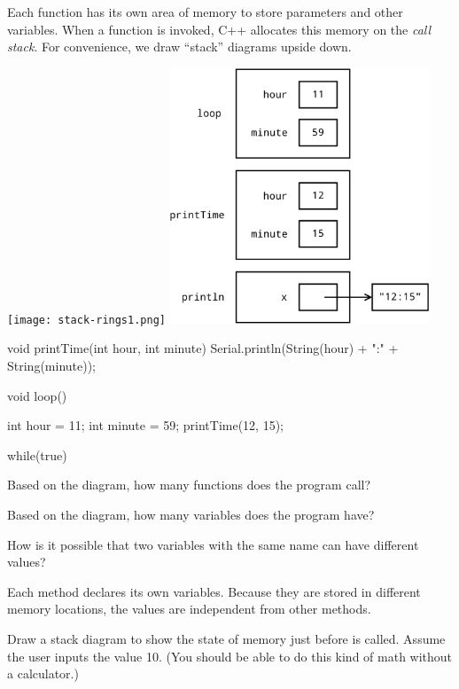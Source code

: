 
Each function has its own area of memory to store parameters and other variables.
When a function is invoked, C++ allocates this memory on the \emph{call stack}.
For convenience, we draw ``stack'' diagrams upside down.

\begin{center}
\texttt{[image: stack-rings1.png]}
\hspace{1em}
\includegraphics[height=3in]{stack1_loop-crop.pdf}
\end{center}


\begin{javalst}
void printTime(int hour, int minute) {
    Serial.println(String(hour) + ":" + String(minute));
}

void loop() {
    int hour = 11;
    int minute = 59;
    printTime(12, 15);

    while(true) {
    }
}
\end{javalst}



\Q Based on the diagram, how many functions does the program call? 
\vspace{1ex}


\Q Based on the diagram, how many variables does the program have? 
\vspace{1ex}


\Q How is it possible that two variables with the same name can have different values?

\begin{answer}
Each method declares its own variables.
Because they are stored in different memory locations, the values are independent from other methods.
\end{answer}

\newpage

\Q \label{drawing}
Draw a stack diagram to show the state of memory just before  is called.
Assume the user inputs the value 10.
(You should be able to do this kind of math without a calculator.)

\newpage

